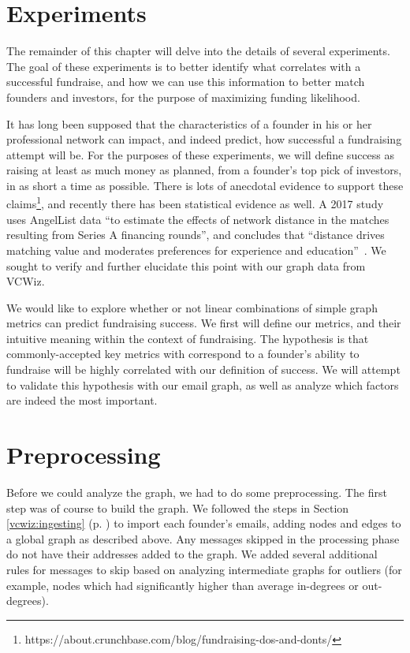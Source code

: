 \section{Experiments}

The remainder of this chapter will delve into the details of several experiments. The goal of these experiments is to better identify what correlates with a successful fundraise, and how we can use this information to better match founders and investors, for the purpose of maximizing funding likelihood.

It has long been supposed that the characteristics of a founder in his or her professional network can impact, and indeed predict, how successful a fundraising attempt will be. For the purposes of these experiments, we will define success as raising at least as much money as planned, from a founder's top pick of investors, in as short a time as possible. There is lots of anecdotal evidence to support these claims\footnote{https://about.crunchbase.com/blog/fundraising-dos-and-donts/}, and recently there has been statistical evidence as well. A 2017 study uses AngelList data ``to estimate the effects of network distance in the matches resulting from Series A financing rounds'', and concludes that ``distance drives matching value and moderates preferences for experience and education''~\cite{pasquini2017matching}. We sought to verify and further elucidate this point with our graph data from VCWiz.

We would like to explore whether or not linear combinations of simple graph metrics can predict fundraising success. We first will define our metrics, and their intuitive meaning within the context of fundraising. The hypothesis is that commonly-accepted key metrics with correspond to a founder's ability to fundraise will be highly correlated with our definition of success. We will attempt to validate this hypothesis with our email graph, as well as analyze which factors are indeed the most important.

\section{Preprocessing}

Before we could analyze the graph, we had to do some preprocessing. The first step was of course to build the graph. We followed the steps in Section \ref{vcwiz:ingesting} (p. \pageref{vcwiz:ingesting}) to import each founder's emails, adding nodes and edges to a global graph as described above. Any messages skipped in the processing phase do not have their addresses added to the graph. We added several additional rules for messages to skip based on analyzing intermediate graphs for outliers (for example, nodes which had significantly higher than average in-degrees or out-degrees).

